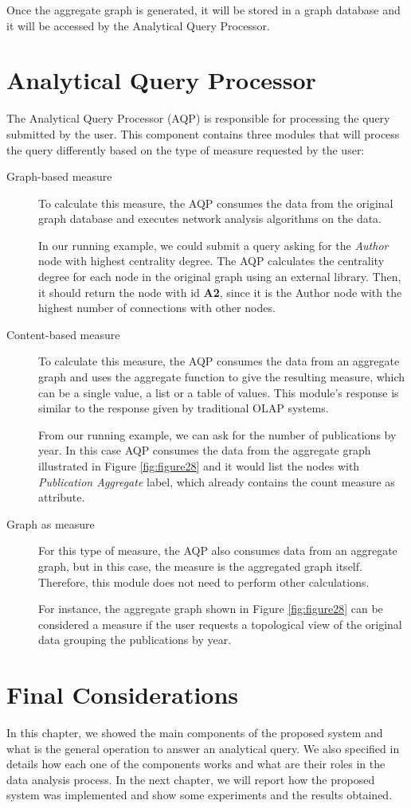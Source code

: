 Once the aggregate graph is generated, it will be stored in a graph database and it will be accessed by the Analytical Query Processor.

\section{Analytical Query Processor}

The Analytical Query Processor (AQP) is responsible for processing the query submitted by the user. This component contains three modules that will process the query differently based on the type of measure requested by the user:
\begin{description}
\item[Graph-based measure] To calculate this measure, the AQP consumes the data from the original graph database and executes network analysis algorithms on the data. 

In our running example, we could submit a query asking for the \emph{Author} node with highest centrality degree. The AQP calculates the centrality degree for each node in the original graph using an external library. Then, it should return the node with id \textbf{A2}, since it is the Author node with the highest number of connections with other nodes.

\item[Content-based measure] To calculate this measure, the AQP consumes the data from an aggregate graph and uses the aggregate function to give the resulting measure, which can be a single value, a list or a table of values. This module's response is similar to the response given by traditional OLAP systems.

From our running example, we can ask for the number of publications by year. In this case AQP consumes the data from the aggregate graph illustrated in Figure \ref{fig:figure28} and it would list the nodes with \emph{Publication Aggregate} label, which already contains the count measure as attribute.

\item[Graph as measure] For this type of measure, the AQP also consumes data from an aggregate graph, but in this case, the measure is the aggregated graph itself. Therefore, this module does not need to perform other calculations.

For instance, the aggregate graph shown in Figure \ref{fig:figure28} can be considered a measure if the user requests a topological view of the original data grouping the publications by year.
\end{description}

\section{Final Considerations}
In this chapter, we showed the main components of the proposed system and what is the general operation to answer an analytical query. We also specified in details how each one of the components works and what are their roles in the data analysis process. In the next chapter, we will report how the proposed system was implemented and show some experiments and the results obtained.